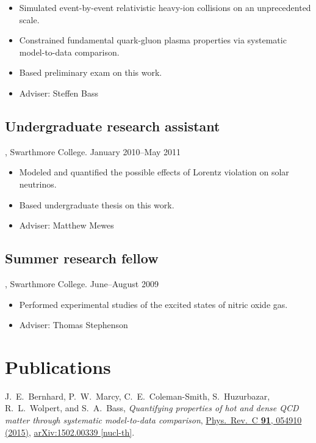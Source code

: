 \documentclass[letterpaper,10pt]{article}
\begin{document}
\begin{itemize}
  \item Simulated event-by-event relativistic heavy-ion collisions on an unprecedented scale.
  \item Constrained fundamental quark-gluon plasma properties via systematic model-to-data comparison.
  \item Based preliminary exam on this work.
  \item Adviser:  Steffen Bass
\end{itemize}


\subsection{Undergraduate research assistant}, Swarthmore College. \hfill January 2010--May 2011

\begin{itemize}
  \item Modeled and quantified the possible effects of Lorentz violation on solar neutrinos.
  \item Based undergraduate thesis on this work.
  \item Adviser:  Matthew Mewes
\end{itemize}



\subsection{Summer research fellow}, Swarthmore College. \hfill June--August 2009

\begin{itemize}
  \item Performed experimental studies of the excited states of nitric oxide gas.
  \item Adviser:  Thomas Stephenson
\end{itemize}



\pagebreak



\section{Publications}

J.~E.~Bernhard, P.~W.~Marcy, C.~E.~Coleman-Smith, S.~Huzurbazar, R.~L.~Wolpert, and S.~A.~Bass,
\emph{Quantifying properties of hot and dense QCD matter through systematic model-to-data comparison},
\href{http://dx.doi.org/10.1103/PhysRevC.91.054910}{Phys.\ Rev.\ C {\bf 91}, 054910 (2015)},
\href{http://arxiv.org/abs/1502.00339}{arXiv:1502.00339 [nucl-th]}.
\end{document}
